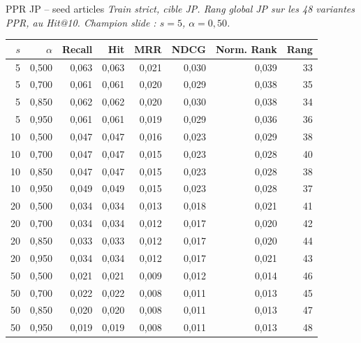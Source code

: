 \documentclass[aspectratio=169,10pt]{beamer}
\begin{document}
\begin{frame}{PPR JP -- seed articles}
  \tiny
  \textit{Train strict, cible JP. Rang global JP sur les 48 variantes PPR, au Hit@10. Champion slide : $s=5$, $\alpha=0{,}50$.}

  \vspace{0.15em}
  \begin{center}
  \renewcommand{\arraystretch}{0.95}
  \setlength{\tabcolsep}{3pt}
  \begin{tabular}{@{}r r r r r r r r@{}}
    \toprule
    $s$ & $\alpha$ & Recall & Hit & MRR & NDCG & Norm. Rank & Rang \\
    \midrule
    \rowcolor{accentsoft}
    5 & 0,500 & 0,063 & 0,063 & 0,021 & 0,030 & 0,039 & 33 \\
    5 & 0,700 & 0,061 & 0,061 & 0,020 & 0,029 & 0,038 & 35 \\
    5 & 0,850 & 0,062 & 0,062 & 0,020 & 0,030 & 0,038 & 34 \\
    5 & 0,950 & 0,061 & 0,061 & 0,019 & 0,029 & 0,036 & 36 \\
    10 & 0,500 & 0,047 & 0,047 & 0,016 & 0,023 & 0,029 & 38 \\
    10 & 0,700 & 0,047 & 0,047 & 0,015 & 0,023 & 0,028 & 40 \\
    10 & 0,850 & 0,047 & 0,047 & 0,015 & 0,023 & 0,028 & 38 \\
    10 & 0,950 & 0,049 & 0,049 & 0,015 & 0,023 & 0,028 & 37 \\
    20 & 0,500 & 0,034 & 0,034 & 0,013 & 0,018 & 0,021 & 41 \\
    20 & 0,700 & 0,034 & 0,034 & 0,012 & 0,017 & 0,020 & 42 \\
    20 & 0,850 & 0,033 & 0,033 & 0,012 & 0,017 & 0,020 & 44 \\
    20 & 0,950 & 0,034 & 0,034 & 0,012 & 0,017 & 0,021 & 43 \\
    50 & 0,500 & 0,021 & 0,021 & 0,009 & 0,012 & 0,014 & 46 \\
    50 & 0,700 & 0,022 & 0,022 & 0,008 & 0,011 & 0,013 & 45 \\
    50 & 0,850 & 0,020 & 0,020 & 0,008 & 0,011 & 0,013 & 47 \\
    50 & 0,950 & 0,019 & 0,019 & 0,008 & 0,011 & 0,013 & 48 \\
    \bottomrule
  \end{tabular}
  \end{center}
\end{frame}
\end{document}

